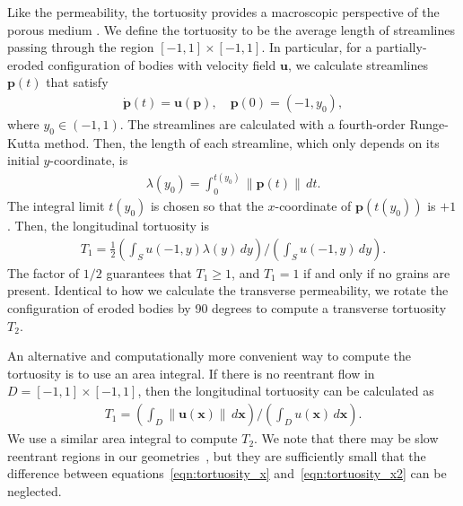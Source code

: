 \documentclass[3p]{elsarticle}
\newcommand{\pp}{{\mathbf{p}}}
\newcommand{\uu}{{\mathbf{u}}}
\newcommand{\xx}{{\mathbf{x}}}
\newcommand{\anis}{\mathcal{A}}
\newcommand{\anistort}{\mathcal{A_T}}
\begin{document}
Like the permeability, the tortuosity provides a macroscopic perspective
of the porous medium \cite{souzy2020velocity}. We define the tortuosity to be the average length
of streamlines passing through the region $[-1,1] \times [-1,1]$. In
particular, for a partially-eroded configuration of bodies with velocity field $\uu$,
we calculate streamlines $\pp(t)$ that satisfy
\begin{align}
  \dot{\pp}(t) = \uu(\pp), \quad \pp(0) = (-1,y_0),
\end{align}
where $y_0 \in (-1,1)$. The streamlines are calculated with a fourth-order Runge-Kutta method. Then, the length of each streamline, which only depends on its initial $y$-coordinate, is
\begin{align}
  \lambda(y_0) = \int_{0}^{t(y_0)} \|\pp(t)\| \,dt.
\end{align}
The integral limit $t(y_0)$ is chosen so that the $x$-coordinate of
$\pp(t(y_0))$ is $+1$. Then, the longitudinal tortuosity is
\begin{align}
  T_1 = \frac{1}{2}\left(\int_{S}u(-1,y)\lambda(y)\,dy \right)
  \Bigg/
  \left(\int_{S}u(-1,y)\,dy \right).
  \label{eqn:tortuosity_x}
\end{align} 
The factor of $1/2$ guarantees that $T_1 \geq 1$, and $T_1 = 1$ if and only if no grains are present. Identical to how we calculate the transverse permeability, we rotate the configuration of eroded bodies by 90 degrees to compute a transverse tortuosity $T_2$.


An alternative and computationally more convenient way to compute the tortuosity is to use an area integral. If there is no reentrant flow in $D = [-1,1] \times [-1,1]$, then the longitudinal tortuosity can be calculated as~\citep{dud-koz-mat2011}
\begin{align}
  T_1 = \left(\int_D \|\uu(\xx)\|\, d\xx \right) \Bigg/
      \left(\int_D u(\xx)\, d\xx \right).
  \label{eqn:tortuosity_x2}
\end{align}
We use a similar area integral to compute $T_2$. We note that there may be slow reentrant regions in our geometries~\cite{chiu2020viscous}, but they are sufficiently small that the difference between equations~\eqref{eqn:tortuosity_x} and~\eqref{eqn:tortuosity_x2} can be neglected.
\end{document}
